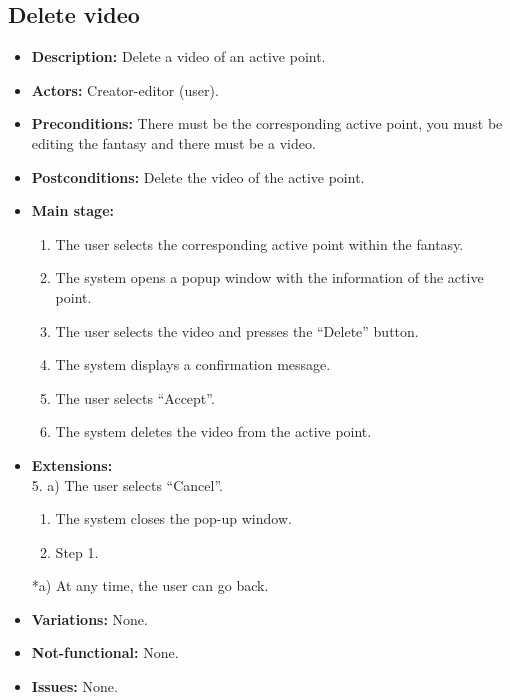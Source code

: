 \subsection{Delete video}
\begin{itemize}
	\item \textbf{Description:} Delete a video of an active point.
	\item \textbf{Actors:} Creator-editor (user).
	\item \textbf{Preconditions:} There must be the corresponding active point, you must be editing the fantasy and there must be a video.
	\item \textbf{Postconditions:} Delete the video of the active point.
	\item \textbf{Main stage:}
	\begin{enumerate}
		\item The user selects the corresponding active point within the fantasy.
		\item The system opens a popup window with the information of the active point.
		\item The user selects the video and presses the ``Delete'' button.
		\item The system displays a confirmation message.
		\item The user selects ``Accept''.
		\item The system deletes the video from the active point.
	\end{enumerate}
	\item \textbf{Extensions:} \\ 5. a) The user selects ``Cancel''.
	\begin{enumerate}
		\item The system closes the pop-up window.
		\item Step 1.
	\end{enumerate}
	*a) At any time, the user can go back.
	\item \textbf{Variations:} None.
	\item \textbf{Not-functional:} None.
	\item \textbf{Issues:} None.
\end{itemize}

